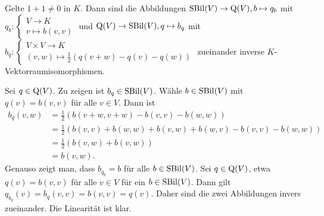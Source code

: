 \documentclass[../../main.tex]{subfiles}
\begin{document}
\begin{notpro}\label{13.4.6}
Gelte $1+1\neq 0$ in $K$. Dann sind die Abbildungen $\operatorname{SBil}(V)\to \operatorname{Q}(V),b\mapsto q_b$ mit $q_b:\begin{cases} V\to K\\ v\mapsto b(v,v)\end{cases}$ und $\operatorname{Q}(V)\to \operatorname{SBil}(V),q\mapsto b_q$ mit $b_q:\begin{cases} V\times V\to K\\ (v,w)\mapsto \frac{1}{2}\left(q(v+w)-q(v)-q(w)\right)\end{cases}$ zueinander inverse $K$-Vektorraumisomorphismen. 
\end{notpro}	
\begin{cproof}
Sei $q\in \operatorname{Q}(V)$. Zu zeigen ist $b_q\in \operatorname{SBil}(V)$. Wähle $b\in \operatorname{SBil}(V)$ mit $q(v)=b(v,v)$ für alle $v\in V$. Dann ist
\begin{align*}
b_q(v,w)&=\frac{1}{2}\left(b(v+w,v+w)-b(v,v)-b(w,w)\right)\\
&=\frac{1}{2}\left(b(v,v)+b(w,w)+b(v,w)+b(w,v)-b(v,v)-b(w,w)\right)\\
&=\frac{1}{2}\left(b(v,w)+b(v,w)\right)\\
&=b(v,w).
\end{align*}
Genauso zeigt man, dass $b_{q_b}=b$ für alle $b\in \operatorname{SBil}(V)$. Sei $q\in \operatorname{Q}(V)$, etwa $q(v)=b(v,v)$ für alle $v\in V$ für ein $b\in \operatorname{SBil}(V)$. Dann gilt $q_{b_q}(v)=b_q(v,v)=b(v,v)=q(v)$. Daher sind die zwei Abbildungen invers zueinander. Die Linearität ist klar.
\end{cproof}
\end{document}
